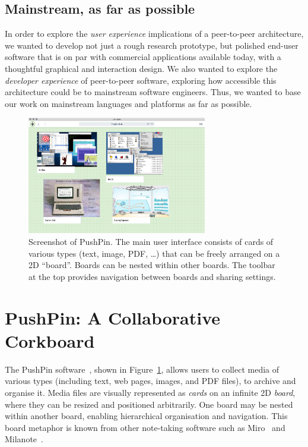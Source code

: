 \documentclass[sigplan,10pt]{acmart}
\begin{document}
\subsection{Mainstream, as far as possible}

In order to explore the \emph{user experience} implications of a peer-to-peer architecture, we wanted to develop not just a rough research prototype, but polished end-user software that is on par with commercial applications available today, with a thoughtful graphical and interaction design.
We also wanted to explore the \emph{developer experience} of peer-to-peer software, exploring how accessible this architecture could be to mainstream software engineers.
Thus, we wanted to base our work on mainstream languages and platforms as far as possible.

\begin{figure}
    \centering
    \includegraphics[width=0.7\textwidth]{pushpin.jpg}
    \caption{Screenshot of PushPin. The main user interface consists of cards of various types (text, image, PDF, \dots) that can be freely arranged on a 2D ``board''. Boards can be nested within other boards. The toolbar at the top provides navigation between boards and sharing settings.}
    \label{fig:pushpin}
\end{figure}

\section{PushPin: A Collaborative Corkboard}

The PushPin software~\cite{PushPinSource}, shown in Figure~\ref{fig:pushpin}, allows users to collect media of various types (including text, web pages, images, and PDF files), to archive and organise it.
Media files are visually represented as \emph{cards} on an infinite 2D \emph{board}, where they can be resized and positioned arbitrarily.
One board may be nested within another board, enabling hierarchical organisation and navigation.
This board metaphor is known from other note-taking software such as Miro~\cite{Miro} and Milanote~\cite{Milanote}.
\end{document}
